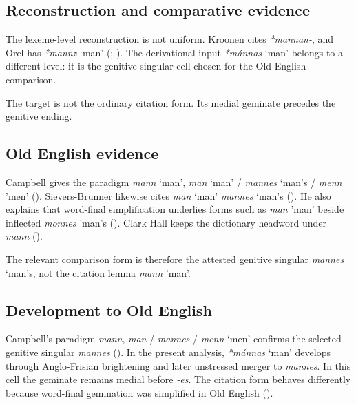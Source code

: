 \documentclass[
  british,
  a4paper,
  openany]{book}
\providecommand{\Recon}[1]{\emph{*#1}}
{\catcode`→=\active \global\def→{\ensuremath{\rightarrow}}}
\providecommand{\Recon}[1]{\emph{*#1}}
{\catcode`→=\active \global\def→{\ensuremath{\rightarrow}}}
\begin{document}
\subsection{Reconstruction and comparative
evidence}\label{reconstruction-and-comparative-evidence-118}

The lexeme-level reconstruction is not uniform. Kroonen cites
\emph{*mannan-}, and Orel has \Recon{mannz} `man'
(;
). The derivational input
{\Recon{mánnas} `man'} belongs to a different level: it is the
genitive-singular cell chosen for the Old English comparison.

The target is not the ordinary citation form. Its medial geminate
precedes the genitive ending.

\subsection{Old English evidence}\label{old-english-evidence-118}

Campbell gives the paradigm {\emph{mann}} `man', {\emph{man}} `man' /
{\emph{mannes}} `man's / {\emph{menn}} 'men'
(). Sievers-Brunner
likewise cites {\emph{man}} `man' {\emph{mannes}} `man's
(). He also
explains that word-final simplification underlies forms such as
{\emph{man}} 'man' beside inflected {\emph{monnes}} 'man's
(). Clark Hall
keeps the dictionary headword under {\emph{mann}}
().

The relevant comparison form is therefore the attested genitive singular
{\emph{mannes}} `man's, not the citation lemma {\emph{mann}} 'man'.

\subsection{Development to Old
English}\label{development-to-old-english-118}

Campbell's paradigm \emph{mann}, \emph{man} / \emph{mannes} /
{\emph{menn}} `men' confirms the selected genitive singular
\emph{mannes} ().
In the present analysis, \Recon{mánnas} `man' develops through
Anglo-Frisian brightening and later unstressed merger to \emph{mannes}.
In this cell the geminate remains medial before \emph{-es}. The citation
form behaves differently because word-final gemination was simplified in
Old English ().
\end{document}
